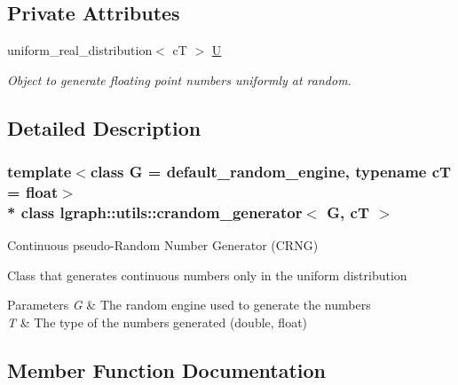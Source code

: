\subsection*{Private Attributes}
\begin{DoxyCompactItemize}
\item 
uniform\+\_\+real\+\_\+distribution$<$ cT $>$ \hyperlink{classlgraph_1_1utils_1_1crandom__generator_a0765c913cb0aa5418689ace83b14479b}{U}\hypertarget{classlgraph_1_1utils_1_1crandom__generator_a0765c913cb0aa5418689ace83b14479b}{}\label{classlgraph_1_1utils_1_1crandom__generator_a0765c913cb0aa5418689ace83b14479b}

\begin{DoxyCompactList}\small\item\em Object to generate floating point numbers uniformly at random. \end{DoxyCompactList}\end{DoxyCompactItemize}


\subsection{Detailed Description}
\subsubsection*{template$<$class G = default\+\_\+random\+\_\+engine, typename cT = float$>$\\*
class lgraph\+::utils\+::crandom\+\_\+generator$<$ G, c\+T $>$}

Continuous pseudo-\/\+Random Number Generator (C\+R\+NG) 

Class that generates continuous numbers only in the uniform distribution


\begin{DoxyParams}{Parameters}
{\em G} & The random engine used to generate the numbers \\
\hline
{\em T} & The type of the numbers generated (double, float) \\
\hline
\end{DoxyParams}


\subsection{Member Function Documentation}
